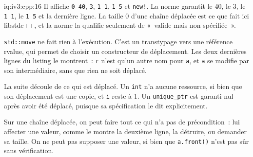 \begin{solution}{iq:iv3:cpp:16}
Il affiche \texttt{0 40}, \texttt{3}, \texttt{1 1}, \texttt{1 5} et \texttt{new!}. La norme garantit le 40, le 3, le \texttt{1 1}, le \texttt{1 5} et la dernière ligne. La taille 0 d'une chaîne déplacée est ce que fait ici libstdc++, et la norme la qualifie seulement de «~valide mais non spécifiée~».

\texttt{std::move} ne fait rien à l'exécution. C'est un transtypage vers une référence rvalue, qui permet de choisir un constructeur de déplacement. Les deux dernières lignes du listing le montrent~: \texttt{r} n'est qu'un autre nom pour \texttt{a}, et \texttt{a} se modifie par son intermédiaire, sans que rien ne soit déplacé.

La suite découle de ce qui est déplacé. Un \texttt{int} n'a aucune ressource, si bien que son déplacement est une copie, et \texttt{i} reste à 1. Un \texttt{unique\_ptr} est garanti nul après avoir été déplacé, puisque sa spécification le dit explicitement.

Sur une chaîne déplacée, on peut faire tout ce qui n'a pas de précondition~: lui affecter une valeur, comme le montre la deuxième ligne, la détruire, ou demander sa taille. On ne peut pas supposer une valeur, si bien que \texttt{a.front()} n'est pas sûr sans vérification.

\end{solution}

